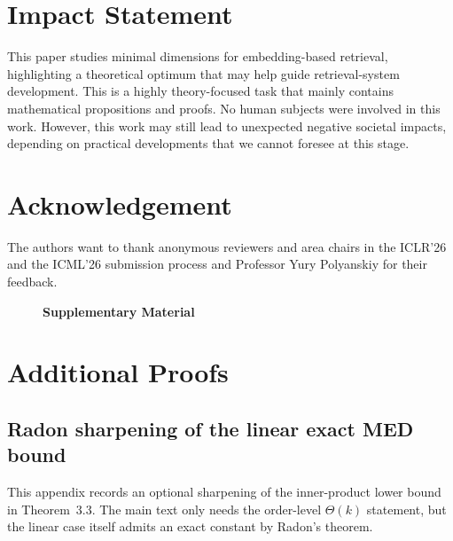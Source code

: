 \documentclass{article}
\begin{document}
\section*{Impact Statement}

This paper studies minimal dimensions for embedding-based retrieval,
highlighting a theoretical optimum that may help guide
retrieval-system development. This is a highly theory-focused task
that mainly contains mathematical propositions and proofs. No human
subjects were involved in this work. However, this work may still
lead to unexpected negative societal impacts, depending on practical
developments that we cannot foresee at this stage.

\section*{Acknowledgement}

The authors want to thank anonymous reviewers and area chairs in the ICLR'26 and the ICML'26 submission process and Professor Yury Polyanskiy for their feedback.




\newpage
\appendix
\onecolumn
\clearpage
\begin{figure}[t!]
  \huge
  \begin{center}
    \textbf{Supplementary Material}
  \end{center}
\end{figure}

\section{Additional Proofs}
\subsection{Radon sharpening of the linear exact MED bound}
\label{app:radon-linear-tightening}

This appendix records an optional sharpening of the inner-product
lower bound in Theorem~3.3. The main text only needs the order-level
\(\Theta(k)\) statement, but the linear case itself admits an exact
constant by Radon's theorem.
\end{document}
